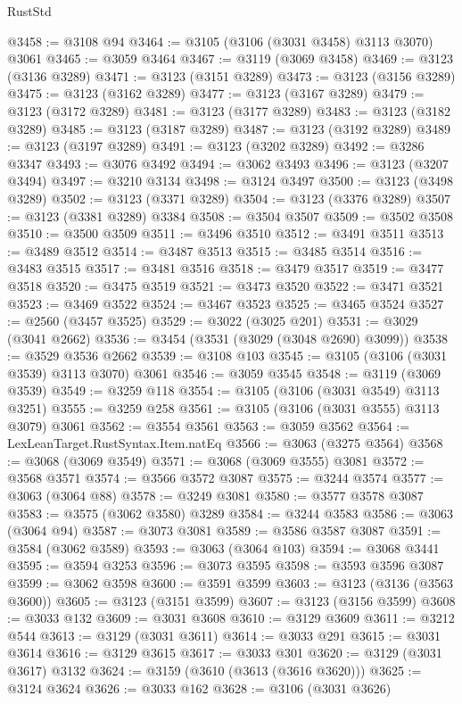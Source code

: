 \begin{lexlean}{RustStd}
\begin{coremodule}
@3458 := @3108 @94
@3464 := @3105 (@3106 (@3031 @3458) @3113 @3070) @3061
@3465 := @3059 @3464
@3467 := @3119 (@3069 @3458)
@3469 := @3123 (@3136 @3289)
@3471 := @3123 (@3151 @3289)
@3473 := @3123 (@3156 @3289)
@3475 := @3123 (@3162 @3289)
@3477 := @3123 (@3167 @3289)
@3479 := @3123 (@3172 @3289)
@3481 := @3123 (@3177 @3289)
@3483 := @3123 (@3182 @3289)
@3485 := @3123 (@3187 @3289)
@3487 := @3123 (@3192 @3289)
@3489 := @3123 (@3197 @3289)
@3491 := @3123 (@3202 @3289)
@3492 := @3286 @3347
@3493 := @3076 @3492
@3494 := @3062 @3493
@3496 := @3123 (@3207 @3494)
@3497 := @3210 @3134
@3498 := @3124 @3497
@3500 := @3123 (@3498 @3289)
@3502 := @3123 (@3371 @3289)
@3504 := @3123 (@3376 @3289)
@3507 := @3123 (@3381 @3289) @3384
@3508 := @3504 @3507
@3509 := @3502 @3508
@3510 := @3500 @3509
@3511 := @3496 @3510
@3512 := @3491 @3511
@3513 := @3489 @3512
@3514 := @3487 @3513
@3515 := @3485 @3514
@3516 := @3483 @3515
@3517 := @3481 @3516
@3518 := @3479 @3517
@3519 := @3477 @3518
@3520 := @3475 @3519
@3521 := @3473 @3520
@3522 := @3471 @3521
@3523 := @3469 @3522
@3524 := @3467 @3523
@3525 := @3465 @3524
@3527 := @2560 (@3457 @3525)
@3529 := @3022 (@3025 @201)
@3531 := @3029 (@3041 @2662)
@3536 := @3454 (@3531 (@3029 (@3048 @2690) @3099))
@3538 := @3529 @3536 @2662
@3539 := @3108 @103
@3545 := @3105 (@3106 (@3031 @3539) @3113 @3070) @3061
@3546 := @3059 @3545
@3548 := @3119 (@3069 @3539)
@3549 := @3259 @118
@3554 := @3105 (@3106 (@3031 @3549) @3113 @3251)
@3555 := @3259 @258
@3561 := @3105 (@3106 (@3031 @3555) @3113 @3079) @3061
@3562 := @3554 @3561
@3563 := @3059 @3562
@3564 := LexLeanTarget.RustSyntax.Item.natEq
@3566 := @3063 (@3275 @3564)
@3568 := @3068 (@3069 @3549)
@3571 := @3068 (@3069 @3555) @3081
@3572 := @3568 @3571
@3574 := @3566 @3572 @3087
@3575 := @3244 @3574
@3577 := @3063 (@3064 @88)
@3578 := @3249 @3081
@3580 := @3577 @3578 @3087
@3583 := @3575 (@3062 @3580) @3289
@3584 := @3244 @3583
@3586 := @3063 (@3064 @94)
@3587 := @3073 @3081
@3589 := @3586 @3587 @3087
@3591 := @3584 (@3062 @3589)
@3593 := @3063 (@3064 @103)
@3594 := @3068 @3441
@3595 := @3594 @3253
@3596 := @3073 @3595
@3598 := @3593 @3596 @3087
@3599 := @3062 @3598
@3600 := @3591 @3599
@3603 := @3123 (@3136 (@3563 @3600))
@3605 := @3123 (@3151 @3599)
@3607 := @3123 (@3156 @3599)
@3608 := @3033 @132
@3609 := @3031 @3608
@3610 := @3129 @3609
@3611 := @3212 @544
@3613 := @3129 (@3031 @3611)
@3614 := @3033 @291
@3615 := @3031 @3614
@3616 := @3129 @3615
@3617 := @3033 @301
@3620 := @3129 (@3031 @3617) @3132
@3624 := @3159 (@3610 (@3613 (@3616 @3620)))
@3625 := @3124 @3624
@3626 := @3033 @162
@3628 := @3106 (@3031 @3626)

\end{coremodule}
\end{lexlean}
